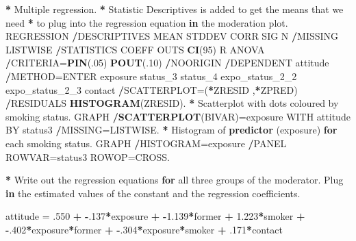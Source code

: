 \documentclass[a4paper]{book}
\newenvironment{Shaded}{\begin{snugshade}}{\end{snugshade}}
\newcommand{\KeywordTok}[1]{\textcolor[rgb]{0,0,0}{\textbf{#1}}}
\newcommand{\DecValTok}[1]{\textcolor[rgb]{0.00,0.00,0.00}{#1}}
\newcommand{\FloatTok}[1]{\textcolor[rgb]{0.00,0.00,0.00}{#1}}
\newcommand{\StringTok}[1]{\textcolor[rgb]{0.00,0.00,0.00}{#1}}
\newcommand{\ControlFlowTok}[1]{\textcolor[rgb]{0.00,0.00,0.00}{\textbf{#1}}}
\newcommand{\OperatorTok}[1]{\textcolor[rgb]{0.00,0.00,0.00}{\textbf{#1}}}
\newcommand{\NormalTok}[1]{#1}
\theoremstyle{definition}
\theoremstyle{definition}
\theoremstyle{definition}
\theoremstyle{remark}
\begin{document}
\begin{Shaded}
\begin{Highlighting}[]
\OperatorTok{*}\StringTok{ }\NormalTok{Multiple regression.  }
\OperatorTok{*}\StringTok{ }\NormalTok{Statistic Descriptives is added to get the means that we need  }
\OperatorTok{*}\StringTok{ }\NormalTok{to plug into the regression equation }\ControlFlowTok{in}\NormalTok{ the moderation plot.  }
\NormalTok{REGRESSION  }
  \OperatorTok{/}\NormalTok{DESCRIPTIVES MEAN STDDEV CORR SIG N  }
  \OperatorTok{/}\NormalTok{MISSING LISTWISE  }
  \OperatorTok{/}\NormalTok{STATISTICS COEFF OUTS }\KeywordTok{CI}\NormalTok{(}\DecValTok{95}\NormalTok{) R ANOVA  }
  \OperatorTok{/}\NormalTok{CRITERIA=}\KeywordTok{PIN}\NormalTok{(.}\DecValTok{05}\NormalTok{) }\KeywordTok{POUT}\NormalTok{(.}\DecValTok{10}\NormalTok{)  }
  \OperatorTok{/}\NormalTok{NOORIGIN   }
  \OperatorTok{/}\NormalTok{DEPENDENT attitude  }
  \OperatorTok{/}\NormalTok{METHOD=ENTER exposure status_}\DecValTok{3}\NormalTok{ status_}\DecValTok{4}\NormalTok{ expo_status_2_}\DecValTok{2}\NormalTok{ expo_status_2_}\DecValTok{3}\NormalTok{ contact  }
  \OperatorTok{/}\NormalTok{SCATTERPLOT=(}\OperatorTok{*}\NormalTok{ZRESID ,}\OperatorTok{*}\NormalTok{ZPRED)  }
  \OperatorTok{/}\NormalTok{RESIDUALS }\KeywordTok{HISTOGRAM}\NormalTok{(ZRESID).  }
\OperatorTok{*}\StringTok{ }\NormalTok{Scatterplot with dots coloured by smoking status.  }
\NormalTok{GRAPH  }
  \OperatorTok{/}\KeywordTok{SCATTERPLOT}\NormalTok{(BIVAR)=exposure WITH attitude BY status3  }
  \OperatorTok{/}\NormalTok{MISSING=LISTWISE.  }
\OperatorTok{*}\StringTok{ }\NormalTok{Histogram of }\KeywordTok{predictor}\NormalTok{ (exposure) }\ControlFlowTok{for}\NormalTok{ each smoking status.  }
\NormalTok{GRAPH  }
  \OperatorTok{/}\NormalTok{HISTOGRAM=exposure  }
  \OperatorTok{/}\NormalTok{PANEL ROWVAR=status3 ROWOP=CROSS.  }
  
\OperatorTok{*}\StringTok{ }\NormalTok{Write out the regression equations }\ControlFlowTok{for}\NormalTok{ all three groups of the moderator.}
\NormalTok{Plug }\ControlFlowTok{in}\NormalTok{ the estimated values of the constant and the regression coefficients.}
  
\NormalTok{attitude =}\StringTok{ }\NormalTok{.}\DecValTok{550} \OperatorTok{+}\StringTok{ }\OperatorTok{-}\NormalTok{.}\DecValTok{137}\OperatorTok{*}\NormalTok{exposure }\OperatorTok{+}\StringTok{ }\OperatorTok{-}\FloatTok{1.139}\OperatorTok{*}\NormalTok{former }\OperatorTok{+}\StringTok{ }\FloatTok{1.223}\OperatorTok{*}\NormalTok{smoker }\OperatorTok{+}\StringTok{ }
\StringTok{  }\OperatorTok{-}\NormalTok{.}\DecValTok{402}\OperatorTok{*}\NormalTok{exposure}\OperatorTok{*}\NormalTok{former }\OperatorTok{+}\StringTok{ }\OperatorTok{-}\NormalTok{.}\DecValTok{304}\OperatorTok{*}\NormalTok{exposure}\OperatorTok{*}\NormalTok{smoker }\OperatorTok{+}\StringTok{ }\NormalTok{.}\DecValTok{171}\OperatorTok{*}\NormalTok{contact  }
  

\end{Highlighting}
\end{Shaded}
\end{document}
